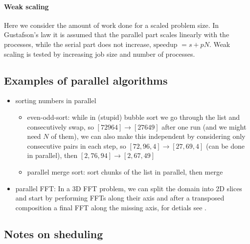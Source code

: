 \paragraph*{Weak scaling} Here we consider the amount of work done
for a scaled problem size. In Gustafson's law it is assumed that the
parallel part scales linearly with the processes, while the serial
part does not increase, $\text{speedup } = s + pN$. Weak scaling
is tested by increasing job size and number of processes.


\subsection{Examples of parallel algorithms}
\begin{itemize}
    \item sorting numbers in parallel
    \begin{itemize}
        \item even-odd-sort: while in (stupid) bubble sort we go through the list and consecutively swap, so $[72964] \rightarrow [27649]$ after one
        run (and we might need $N$ of them), we can also make this independent by considering only consecutive pairs in each step, so
        $[72,96,4] \rightarrow [27,69,4]$ (can be done in parallel), then $[2,76,94] \rightarrow [2,67,49]$
        \item parallel merge sort: sort chunks of the list in parallel, then merge
    \end{itemize}
    \item parallel FFT: In a 3D FFT problem, we can split the domain into 2D slices and start by performing FFTs along their axis and after a transposed
    composition a final FFT along the missing axis, for detials see \cite{jagode06}.
\end{itemize}


\subsection{Notes on sheduling}

